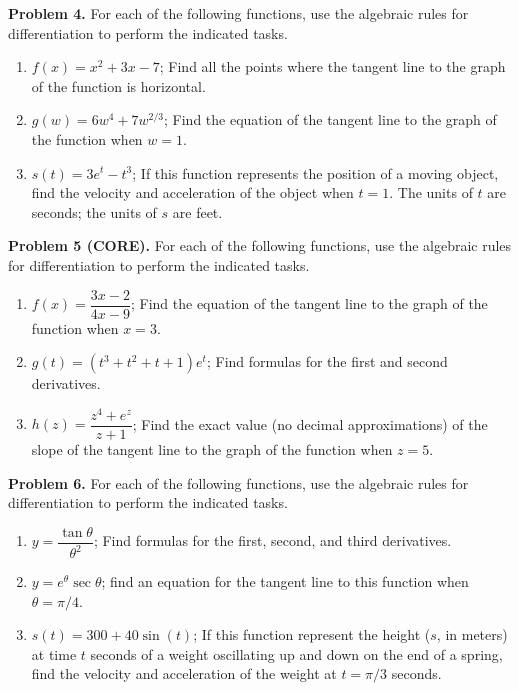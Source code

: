 \documentclass[addpoints]{exam}
\begin{document}
\vspace{0.3in}

\noindent
\textbf{Problem 4.} For each of the following functions, use the algebraic rules for differentiation to perform the indicated tasks. 
	\begin{enumerate}
		\item $f(x) = x^2 + 3x - 7$; Find all the points where the tangent line to the graph of the function is horizontal. 
		\item $g(w) = 6w^4 + 7w^{2/3}$; Find the equation of the tangent line to the graph of the function when $w = 1$. 
		\item $s(t) = 3e^t - t^3$; If this function represents the position of a moving object, find the velocity and acceleration of the object when $t = 1$. The units of $t$ are seconds; the units of $s$ are feet.  
	\end{enumerate}

\vspace{0.3in}

\noindent
\textbf{Problem 5 (CORE).} For each of the following functions, use the algebraic rules for differentiation to perform the indicated tasks.
	\begin{enumerate}
		\item $f(x) = \dfrac{3x- 2}{4x - 9}$; Find the equation of the tangent line to the graph of the function when $x = 3$. 
		\item $g(t) = (t^3 + t^2 + t + 1)e^t$; Find formulas for the first and second derivatives. 
		\item $h(z) = \dfrac{z^4 + e^z}{z + 1}$; Find the exact value (no decimal approximations) of the slope of the tangent line to the graph of the function when $z = 5$. 
	\end{enumerate}


\vspace{0.3in}

\noindent
\textbf{Problem 6.} For each of the following functions, use the algebraic rules for differentiation to perform the indicated tasks. 
	\begin{enumerate}
		\item $y = \dfrac{\tan \theta}{\theta^2}$; Find formulas for the first, second, and third derivatives. 
		\item $y = e^\theta \sec \theta$; find an equation for the tangent line to this function when $\theta = \pi/4$. 
		\item $s(t) = 300 + 40 \sin (t)$; If this function represent the height ($s$, in meters) at time $t$ seconds of a weight oscillating up and down on the end of a spring, find the velocity and acceleration of the weight at $t = \pi/3$ seconds. 
	\end{enumerate}
\end{document}

